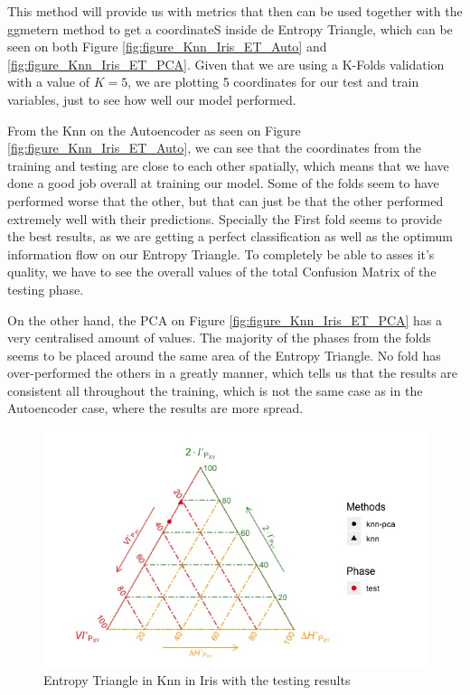 This method will provide us with metrics that then can be used together with the ggmetern method to get a coordinateS inside de Entropy Triangle, which can be seen on both Figure \ref{fig:figure_Knn_Iris_ET_Auto} and \ref{fig:figure_Knn_Iris_ET_PCA}. Given that we are using a K-Folds validation with a value of $K = 5$, we are plotting 5 coordinates for our test and train variables, just to see how well our model performed.\newline

From the Knn on the Autoencoder as seen on Figure \ref{fig:figure_Knn_Iris_ET_Auto}, we can see that the coordinates from the training and testing are close to each other spatially, which means that we have done a good job overall at training our model. Some of the folds seem to have performed worse that the other, but that can just be that the other performed extremely well with their predictions. Specially the First fold seems to provide the best results, as we are getting a perfect classification as well as the optimum information flow on our Entropy Triangle. To completely be able to asses it's quality, we have to see the overall values of the total Confusion Matrix of the testing phase.\par

On the other hand, the PCA on Figure \ref{fig:figure_Knn_Iris_ET_PCA} has a very centralised amount of values. The majority of the phases from the folds seems to be placed around the same area of the Entropy Triangle. No fold has over-performed the others in a greatly manner, which tells us that the results are consistent all throughout the training, which is not the same case as in the Autoencoder case, where the results are more spread. \par

\begin{figure}[H]
	\centering
	\includegraphics[width=1.2\linewidth]{Figuras_tfg/Total_ET_Knn_Iris}
	\caption{Entropy Triangle in Knn in Iris with the testing results}
	\label{fig:figure_Knn_Iris_ET_PCA_Auto}
\end{figure}

